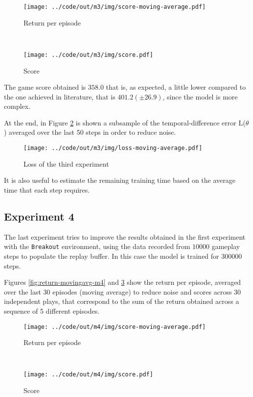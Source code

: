 \documentclass[a4paper,12pt]{article} %
\begin{document}
	\begin{figure}[htb]
		\begin{minipage}[b]{.49\textwidth}
			\centering
			\texttt{[image: ../code/out/m3/img/score-moving-average.pdf]}	
			\caption{Return per episode}
			\label{fig:return-movingavg-m3}
		\end{minipage}
		~
		\begin{minipage}[b]{.49\textwidth}
			\centering
			\texttt{[image: ../code/out/m3/img/score.pdf]}	
			\caption{Score}
			\label{fig:score-m3}
		\end{minipage}
	\end{figure}
	
	The game score obtained is $358.0$ that is, as expected, a little lower compared to the one achieved in literature, that is $401.2 (\pm 26.9)$, since the model is more complex.
	
	\bigskip
	
	At the end, in Figure \ref{fig:loss-m3} is shown a subsample of the temporal-difference error L($\theta$) averaged over the last 50 steps in order to reduce noise.
	\begin{figure}[htb]
		\centering
		\texttt{[image: ../code/out/m3/img/loss-moving-average.pdf]}	
		\caption{Loss of the third experiment}
		\label{fig:loss-m3}
	\end{figure} 
	
	
	It is also useful to estimate the remaining training time based on the average time that each step requires.
	
	\subsection{Experiment 4}
	The last experiment tries to improve the results obtained in the first experiment with the \texttt{Breakout} environment, using the data recorded from $10000$ gameplay steps to populate the replay buffer.
	In this case the model is trained for $300000$ steps.
	\bigskip

	Figures \ref{fig:return-movingavg-m4} and \ref{fig:score-m4} show the return per episode, averaged over the last 30 episodes (moving average) to reduce noise and scores across 30 independent plays, that correspond to the sum of the return obtained across a sequence of 5 different episodes.
	
	\begin{figure}[h]
		\begin{minipage}[b]{.49\textwidth}
			\centering
			\texttt{[image: ../code/out/m4/img/score-moving-average.pdf]}	
			\caption{Return per episode}
			\label{fig:return-movingavg-m4}
		\end{minipage}
		~
		\begin{minipage}[b]{.49\textwidth}
			\centering
			\texttt{[image: ../code/out/m4/img/score.pdf]}	
			\caption{Score}
			\label{fig:score-m4}
		\end{minipage}
	\end{figure}
	
\end{document}
